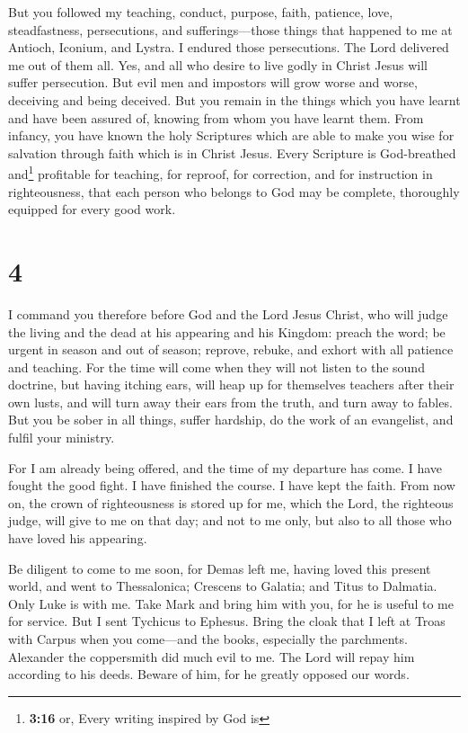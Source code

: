  But you followed my teaching, conduct, purpose, faith,
patience, love, steadfastness,  persecutions, and
sufferings---those things that happened to me at Antioch, Iconium, and
Lystra. I endured those persecutions. The Lord delivered me out of them
all.  Yes, and all who desire to live godly in Christ
Jesus will suffer persecution.  But evil men and
impostors will grow worse and worse, deceiving and being deceived.
 But you remain in the things which you have learnt and
have been assured of, knowing from whom you have learnt them.
 From infancy, you have known the holy Scriptures which
are able to make you wise for salvation through faith which is in Christ
Jesus.  Every Scripture is God-breathed and\footnote{\textbf{3:16}
  or, Every writing inspired by God is} profitable for teaching, for
reproof, for correction, and for instruction in righteousness,
 that each person who belongs to God may be complete,
thoroughly equipped for every good work.

\hypertarget{section-3}{%
\section{4}\label{section-3}}

 I command you therefore before God and the Lord Jesus
Christ, who will judge the living and the dead at his appearing and his
Kingdom:  preach the word; be urgent in season and out of
season; reprove, rebuke, and exhort with all patience and teaching.
 For the time will come when they will not listen to the
sound doctrine, but having itching ears, will heap up for themselves
teachers after their own lusts,  and will turn away their
ears from the truth, and turn away to fables.  But you be
sober in all things, suffer hardship, do the work of an evangelist, and
fulfil your ministry.

 For I am already being offered, and the time of my
departure has come.  I have fought the good fight. I have
finished the course. I have kept the faith.  From now on,
the crown of righteousness is stored up for me, which the Lord, the
righteous judge, will give to me on that day; and not to me only, but
also to all those who have loved his appearing.

 Be diligent to come to me soon,  for Demas
left me, having loved this present world, and went to Thessalonica;
Crescens to Galatia; and Titus to Dalmatia.  Only Luke is
with me. Take Mark and bring him with you, for he is useful to me for
service.  But I sent Tychicus to Ephesus. 
Bring the cloak that I left at Troas with Carpus when you come---and the
books, especially the parchments.  Alexander the
coppersmith did much evil to me. The Lord will repay him according to
his deeds.  Beware of him, for he greatly opposed our
words.

